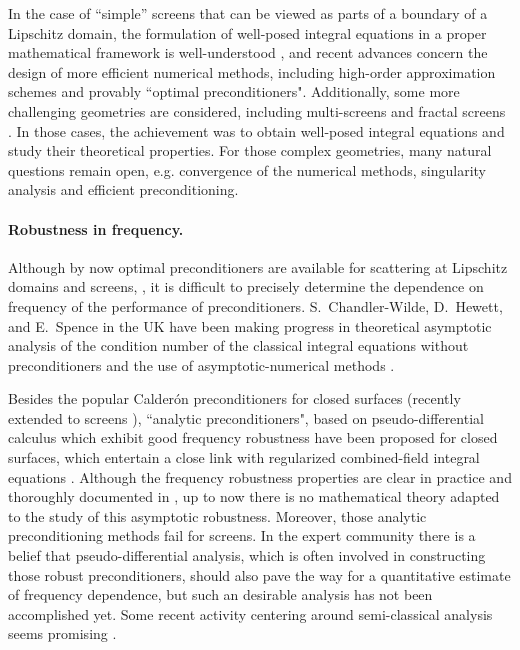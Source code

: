 \documentclass[]{report}
\begin{document}
In the case of ``simple'' screens that can be viewed as parts of a boundary of a Lipschitz
domain, the formulation of well-posed integral equations in a proper mathematical
framework is well-understood \cite{stephan1984augmented,wendland1990hypersingular}, and
recent advances concern the design of more efficient numerical methods, including
high-order approximation schemes and provably ``optimal preconditioners". Additionally,
some more challenging geometries are considered, including multi-screens
\cite{claeys2013integral,claeys2020quotient} and fractal screens
\cite{chandlerWilde2017sobolev}. In those cases, the achievement was to obtain well-posed
integral equations and study their theoretical properties. For those complex geometries,
many natural questions remain open, e.g. convergence of the numerical methods, singularity
analysis and efficient preconditioning.

\paragraph{Robustness in frequency.} Although by now optimal preconditioners are available
for scattering at Lipschitz domains and screens,
\cite{steinbach1998construction,hiptmair2006operator}, it is difficult to precisely
determine the dependence on frequency of the performance of
preconditioners. S.~Chandler-Wilde, D.~Hewett, and E.~Spence in the UK have been making
progress in theoretical asymptotic analysis of the condition number of the classical integral equations without
preconditioners \cite{chandler2020high} and the use of asymptotic-numerical methods
\cite{chandlerWilde2015high}.

Besides the popular Calder\'{o}n preconditioners
\cite{christiansen2000preconditionneurs,christiansen2002preconditioner} for closed
surfaces (recently extended to screens \cite{bruno2012second}), ``analytic
preconditioners", based on pseudo-differential calculus which exhibit good frequency
robustness \cite{alouges2007stable,antoine2007generalized} have been proposed for closed surfaces, which
entertain a close link with regularized combined-field integral equations
\cite{buffa2005regularized}. Although the frequency robustness properties are clear in
practice and thoroughly documented in \cite{boubendir2014well}, up to now there is no
mathematical theory adapted to the study of this asymptotic robustness. Moreover, those
analytic preconditioning methods fail for screens. In the expert community there is a
belief that pseudo-differential analysis, which is often involved in constructing those
robust preconditioners, should also pave the way for a quantitative estimate of frequency
dependence, but such an desirable analysis has not been accomplished yet. Some recent
activity centering around semi-classical analysis seems promising
\cite{galkowski2019wavenumber}.
\end{document}
